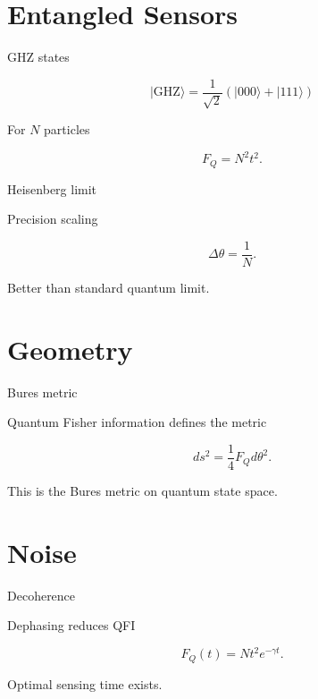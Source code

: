 \documentclass[aspectratio=169]{beamer}
\begin{document}
\section{Entangled Sensors}

\begin{frame}{GHZ states}

\begin{equation}
|\mathrm{GHZ}\rangle
=
\frac{1}{\sqrt2}(|000\rangle + |111\rangle)
\end{equation}

For $N$ particles

\begin{equation}
F_Q = N^2 t^2.
\end{equation}
\end{frame}

\begin{frame}{Heisenberg limit}

Precision scaling

\begin{equation}
\Delta \theta = \frac{1}{N}.
\end{equation}

Better than standard quantum limit.
\end{frame}

\section{Geometry}

\begin{frame}{Bures metric}

Quantum Fisher information defines the metric

\begin{equation}
ds^2 = \frac14 F_Q d\theta^2.
\end{equation}

This is the Bures metric on quantum state space.
\end{frame}

\section{Noise}

\begin{frame}{Decoherence}

Dephasing reduces QFI

\begin{equation}
F_Q(t) = N t^2 e^{-\gamma t}.
\end{equation}

Optimal sensing time exists.
\end{frame}
\end{document}
